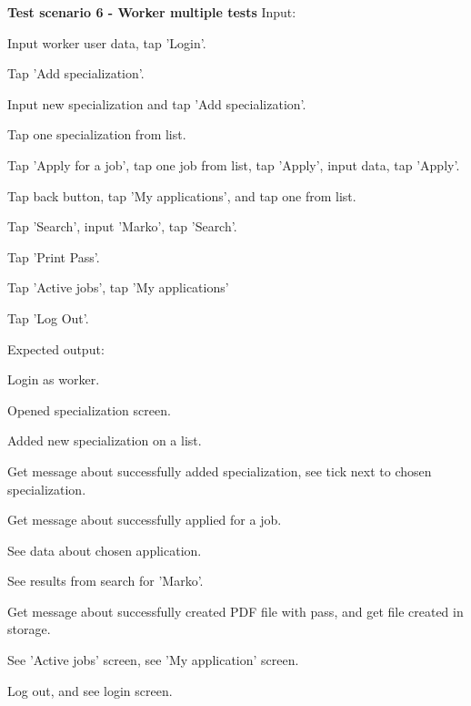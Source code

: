 			\textbf{Test scenario 6 - Worker multiple tests}
			Input:
			\begin{packed_enum}
				\item Input worker user data, tap 'Login'.
				\item Tap 'Add specialization'.
				\item Input new specialization and tap 'Add specialization'.
				\item Tap one specialization from list.
				\item Tap 'Apply for a job', tap one job from list, tap 'Apply', input data, tap 'Apply'.
				\item Tap back button, tap 'My applications', and tap one from list.
				\item Tap 'Search', input 'Marko', tap 'Search'.
				\item Tap 'Print Pass'.
				\item Tap 'Active jobs', tap 'My applications'
				\item Tap 'Log Out'.
			\end{packed_enum}
			
			Expected output:
			\begin{packed_enum}
				\item Login as worker.
				\item Opened specialization screen.
				\item Added new specialization on a list.
				\item Get message about successfully added specialization, see tick next to chosen specialization.
				\item Get message about successfully applied for a job.
				\item See data about chosen application.
				\item See results from search for 'Marko'.
				\item Get message about successfully created PDF file with pass, and get file created in storage.
				\item See 'Active jobs' screen, see 'My application' screen.
				\item Log out, and see login screen.
			\end{packed_enum}
			
